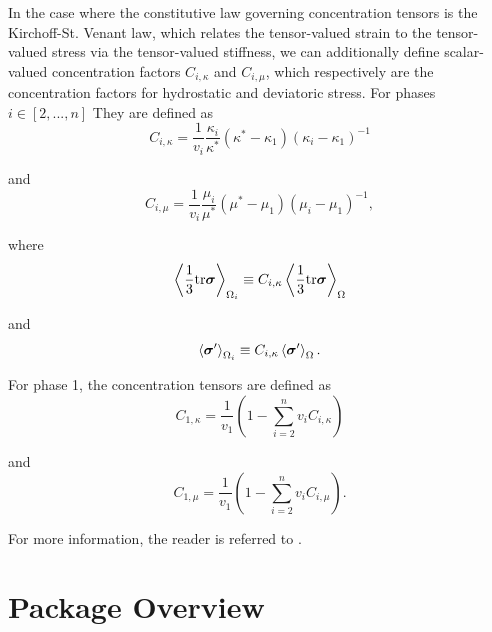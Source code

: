 \documentclass[letterpaper,12pt]{formatfile}
\begin{document}
In the case where the constitutive law governing concentration tensors is the Kirchoff-St. Venant law, which relates the tensor-valued strain to the tensor-valued stress via the tensor-valued stiffness, we can additionally define scalar-valued concentration factors $C_{i,\kappa}$ and $C_{i,\mu}$, which respectively are the concentration factors for hydrostatic and deviatoric stress. For phases $i\in[2,...,n]$ They are defined as
\begin{equation}
C_{i,\kappa} = \frac{1}{v_{i}}\frac{\kappa_{i}}{\kappa^{*}}(\kappa^{*} - \kappa_{1})(\kappa_{i} - \kappa_{1})^{-1}
\label{eqn:sph-conc-fact}
\end{equation}

\noindent and
\begin{equation}
C_{i,\mu} = \frac{1}{v_{i}}\frac{\mu_{i}}{\mu^{*}}(\mu^{*} - \mu_{1})(\mu_{i} - \mu_{1})^{-1},
\label{eqn:dev-conc-fact}
\end{equation}

\noindent where 
\begin{equation}
\left\langle \frac{1}{3}\text{tr}\mbox{\boldmath $\sigma$} \right\rangle_{\Omega_{i}} \equiv C_{i,\kappa} \left\langle \frac{1}{3}\text{tr}\mbox{\boldmath $\sigma$} \right\rangle_{\Omega} 
\label{eqn:sph-conc-fact-def}
\end{equation}

\noindent and
\begin{equation}
\left\langle \mbox{\boldmath $\sigma$}' \right\rangle_{\Omega_{i}} \equiv C_{i,\kappa} \left\langle \mbox{\boldmath $\sigma$}' \right\rangle_{\Omega}.
\label{eqn:dev-conc-fact-def}
\end{equation}

\noindent For phase 1, the concentration tensors are defined as
\begin{equation}
C_{1,\kappa} = \frac{1}{v_{1}} \left( 1 - \sum\limits_{i=2}^{n} v_{i} C_{i,\kappa} \right)
\label{eqn:sph-cf-1}
\end{equation}

\noindent and
\begin{equation}
C_{1,\mu} = \frac{1}{v_{1}} \left( 1 - \sum\limits_{i=2}^{n} v_{i} C_{i,\mu} \right).
\label{eqn:dev-cf-1}
\end{equation}

\noindent For more information, the reader is referred to \cite{zohdi-course-reader}.

\section{Package Overview} \label{sec:package-overview}
\end{document}
